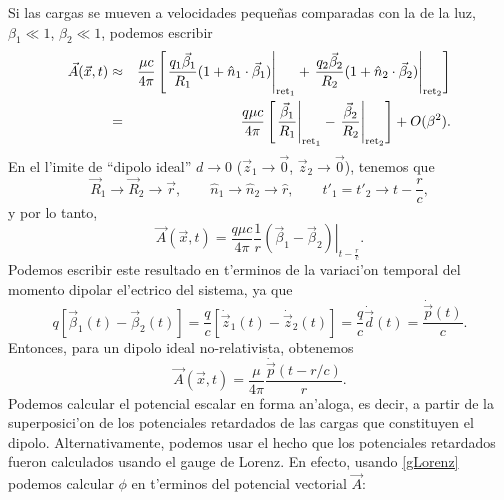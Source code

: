 Si las cargas se mueven a velocidades peque\~nas comparadas con la de la luz, $\beta_1\ll 1$, $\beta_2\ll 1$, podemos escribir
\begin{eqnarray}
\vec{A}(\vec{x},t)&\approx&\frac{\mu c}{4\pi}\left[\left.\frac{q_1\vec{\beta}_1}{R_1}(1+\hat{n}_1\cdot\vec{\beta}_1)\right|_{{\rm ret}_1} +\left.\frac{q_2\vec{\beta}_2}{R_2}(1+\hat{n}_2\cdot\vec{\beta}_2)\right|_{{\rm ret}_2}\right] \\
&=&\frac{q\mu c}{4\pi}\left[\left.\frac{\vec{\beta}_1}{R_1}\right|_{{\rm ret}_1} -\left.\frac{\vec{\beta}_2}{R_2}\right|_{{\rm ret}_2}\right] +O(\beta^2).
\end{eqnarray}
En el l'imite de ``dipolo ideal'' $d\to 0$ ($\vec{z}_1\to\vec{0}$, $\vec{z}_2\to\vec{0}$), tenemos que
\begin{equation}
 \vec{R}_1\to\vec{R}_2\to\vec{r}, \qquad \hat{n}_1\to\hat{n}_2\to\hat{r}, \qquad  t'_1=t'_2\to t-\frac{r}{c},
\end{equation}
y por lo tanto,
\begin{equation}
 \vec{A}(\vec{x},t)=\frac{q\mu c}{4\pi}\frac{1}{r}\left.(\vec{\beta}_1-\vec{\beta}_2)\right|_{t-\frac{r}{c}}.
\end{equation}
Podemos escribir este resultado en t'erminos de la variaci'on temporal del momento dipolar el'ectrico del sistema, ya que
\begin{equation}
q\left[\vec{\beta}_1(t)-\vec{\beta}_2(t)\right]=\frac{q}{c}\left[\dot{\vec{z}}_1(t)-\dot{\vec{z}}_2(t)\right]=\frac{q}{c}\dot{\vec{d}}(t)=\frac{\dot{\vec{p}}(t)}{c}.
\end{equation}
Entonces, para un dipolo ideal no-relativista, obtenemos
\begin{equation}
\boxed{\vec{A}(\vec{x},t)=\frac{\mu}{4\pi}\frac{\dot{\vec{p}}(t-{r}/{c})}{r}.} \label{Adipid}
\end{equation}
Podemos calcular el potencial escalar en forma an'aloga, es decir, a partir de la superposici'on de los potenciales retardados de las cargas que constituyen el dipolo. Alternativamente, podemos usar el hecho que los potenciales retardados fueron calculados usando el gauge de Lorenz. En efecto, usando \eqref{gLorenz} podemos calcular $\phi$ en t'erminos del potencial vectorial $\vec{A}$:

